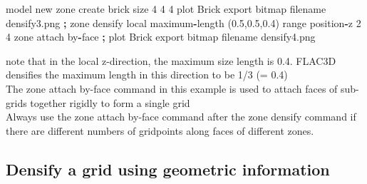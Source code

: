 \documentclass[a4paper, nobind]{templates/ociamthesis}
\newenvironment{Shaded}{\begin{snugshade}}{\end{snugshade}}
\newcommand{\BuiltInTok}[1]{#1}
\newcommand{\DecValTok}[1]{\textcolor[rgb]{0.00,0.00,0.81}{#1}}
\newcommand{\FloatTok}[1]{\textcolor[rgb]{0.00,0.00,0.81}{#1}}
\newcommand{\NormalTok}[1]{#1}
\newcommand{\OperatorTok}[1]{\textcolor[rgb]{0.81,0.36,0.00}{\textbf{#1}}}
\newcommand{\StringTok}[1]{\textcolor[rgb]{0.31,0.60,0.02}{#1}}
\renewenvironment{Shaded}
{
  \vspace{10pt}%
  \begin{snugshade}%
}{%
  \end{snugshade}%
  \vspace{8pt}%
}
\begin{document}
\begin{Shaded}
\begin{Highlighting}[]
\NormalTok{model new}
\NormalTok{zone create brick size }\DecValTok{4} \DecValTok{4} \DecValTok{4}
\NormalTok{plot }\StringTok{\textquotesingle{}Brick\textquotesingle{}}\NormalTok{ export bitmap filename }\StringTok{\textquotesingle{}densify3.png\textquotesingle{}}
\OperatorTok{;}
\NormalTok{zone densify local maximum}\OperatorTok{{-}}\NormalTok{length (}\FloatTok{0.5}\NormalTok{,}\FloatTok{0.5}\NormalTok{,}\FloatTok{0.4}\NormalTok{) }\BuiltInTok{range}\NormalTok{ position}\OperatorTok{{-}}\NormalTok{z }\DecValTok{2} \DecValTok{4}
\NormalTok{zone attach by}\OperatorTok{{-}}\NormalTok{face}
\OperatorTok{;}
\NormalTok{plot }\StringTok{\textquotesingle{}Brick\textquotesingle{}}\NormalTok{ export bitmap filename }\StringTok{\textquotesingle{}densify4.png\textquotesingle{}}
\end{Highlighting}
\end{Shaded}

note that in the local z-direction, the maximum size length is 0.4. FLAC3D densifies the maximum length in this direction to be 1/3 (= 0.4)\\
The zone attach by-face command in this example is used to attach faces of sub-grids together rigidly to form a single grid\\

Always use the zone attach by-face command after the zone densify command if there are different numbers of gridpoints along faces of different zones.\\

\hypertarget{densify-a-grid-using-geometric-information}{%
\subsection{Densify a grid using geometric information}\label{densify-a-grid-using-geometric-information}}
\end{document}
